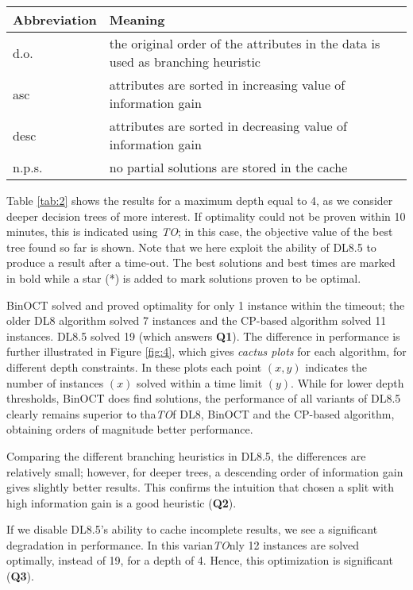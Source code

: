\noindent\begin{tabularx}{\linewidth}{lX}
	Abbreviation	& Meaning		\\\hline
	d.o.			& the original order of the attributes in the data is used as branching heuristic		\\
	asc				& attributes are sorted in increasing value of information gain		\\
	desc			& attributes are sorted in decreasing value of information gain		\\
	n.p.s.			& no partial solutions are stored in the cache
\end{tabularx}

Table \ref{tab:2} shows the results for a maximum depth equal to 4, as we consider deeper decision trees of more interest. If optimality could not be proven within 10 minutes, this is indicated using \emph{TO}; in this case, the objective value of the best tree found so far is shown. Note that we here exploit the ability of DL8.5 to produce a result after a time-out. The best solutions and best times are marked in bold while a star (*) is added to mark solutions proven to be optimal.

BinOCT solved and proved optimality for only 1 instance within the timeout; the older DL8 algorithm solved 7 instances and the CP-based algorithm solved 11 instances. DL8.5 solved 19 (which answers \textbf{Q1}). The difference in performance is further illustrated in Figure \ref{fig:4}, which gives \emph{cactus plots} for each algorithm, for different depth constraints. In these plots each point $(x, y)$ indicates the number of instances $(x)$ solved within a time limit $(y)$. While for lower depth thresholds, BinOCT does find solutions, the performance of all variants of DL8.5 clearly remains superior to tha\emph{TO}f DL8, BinOCT and the CP-based algorithm, obtaining orders of magnitude better performance.

Comparing the different branching heuristics in DL8.5, the differences are relatively small; however, for deeper trees, a descending order of information gain gives slightly better results. This confirms the intuition that chosen a split with high information gain is a good heuristic (\textbf{Q2}).

If we disable DL8.5’s ability to cache incomplete results, we see a significant degradation in performance. In this varian\emph{TO}nly 12 instances are solved optimally, instead of 19, for a depth of 4. Hence, this optimization is significant (\textbf{Q3}).

